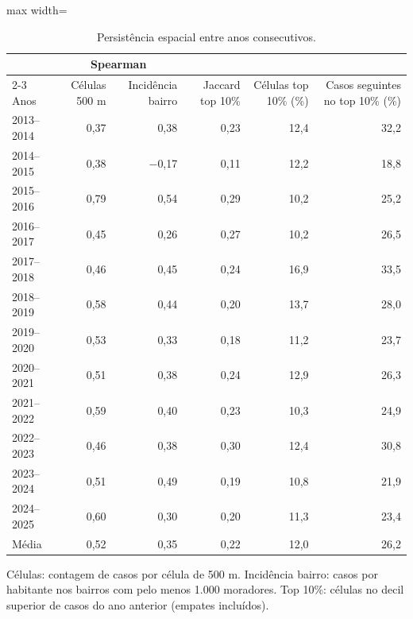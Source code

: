 \begin{table}[htbp]
\centering
\small
\caption{Persistência espacial entre anos consecutivos.}
\label{tab:persistencia}
\begin{adjustbox}{max width=\linewidth}
\begin{tabular}{lrrrrr}
\toprule
& \multicolumn{2}{c}{Spearman} & & & \\
\cmidrule(lr){2-3}
Anos & Células 500 m & Incidência bairro & Jaccard top 10\% & Células top 10\% (\%) & Casos seguintes no top 10\% (\%) \\
\midrule
2013--2014 & 0,37 & 0,38 & 0,23 & 12,4 & 32,2 \\
2014--2015 & 0,38 & $-$0,17 & 0,11 & 12,2 & 18,8 \\
2015--2016 & 0,79 & 0,54 & 0,29 & 10,2 & 25,2 \\
2016--2017 & 0,45 & 0,26 & 0,27 & 10,2 & 26,5 \\
2017--2018 & 0,46 & 0,45 & 0,24 & 16,9 & 33,5 \\
2018--2019 & 0,58 & 0,44 & 0,20 & 13,7 & 28,0 \\
2019--2020 & 0,53 & 0,33 & 0,18 & 11,2 & 23,7 \\
2020--2021 & 0,51 & 0,38 & 0,24 & 12,9 & 26,3 \\
2021--2022 & 0,59 & 0,40 & 0,23 & 10,3 & 24,9 \\
2022--2023 & 0,46 & 0,38 & 0,30 & 12,4 & 30,8 \\
2023--2024 & 0,51 & 0,49 & 0,19 & 10,8 & 21,9 \\
2024--2025 & 0,60 & 0,30 & 0,20 & 11,3 & 23,4 \\
\midrule
Média & 0,52 & 0,35 & 0,22 & 12,0 & 26,2 \\
\bottomrule
\end{tabular}
\end{adjustbox}
\par\smallskip\begin{minipage}{0.95\linewidth}\footnotesize Células: contagem de casos por célula de 500 m. Incidência bairro: casos por habitante nos bairros com pelo menos 1.000 moradores. Top 10\%: células no decil superior de casos do ano anterior (empates incluídos).\end{minipage}
\end{table}
